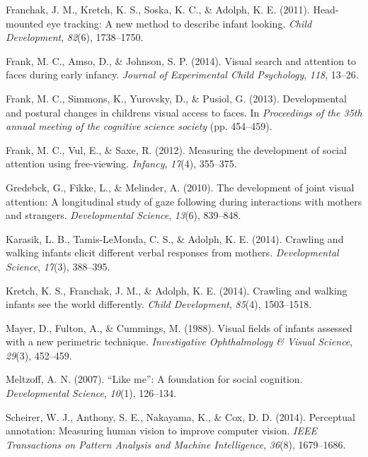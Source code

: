 \documentclass[10pt, letterpaper]{article}
\begin{document}
\hypertarget{ref-franchak2011}{}
Franchak, J. M., Kretch, K. S., Soska, K. C., \& Adolph, K. E. (2011).
Head-mounted eye tracking: A new method to describe infant looking.
\emph{Child Development}, \emph{82}(6), 1738--1750.

\hypertarget{ref-frank2014visual}{}
Frank, M. C., Amso, D., \& Johnson, S. P. (2014). Visual search and
attention to faces during early infancy. \emph{Journal of Experimental
Child Psychology}, \emph{118}, 13--26.

\hypertarget{ref-frank2013}{}
Frank, M. C., Simmons, K., Yurovsky, D., \& Pusiol, G. (2013).
Developmental and postural changes in childrens visual access to faces.
In \emph{Proceedings of the 35th annual meeting of the cognitive science
society} (pp. 454--459).

\hypertarget{ref-frank2012measuring}{}
Frank, M. C., Vul, E., \& Saxe, R. (2012). Measuring the development of
social attention using free-viewing. \emph{Infancy}, \emph{17}(4),
355--375.

\hypertarget{ref-gredeback2010development}{}
Gredebck, G., Fikke, L., \& Melinder, A. (2010). The
development of joint visual attention: A longitudinal study of gaze
following during interactions with mothers and strangers.
\emph{Developmental Science}, \emph{13}(6), 839--848.

\hypertarget{ref-karasik2014}{}
Karasik, L. B., Tamis-LeMonda, C. S., \& Adolph, K. E. (2014). Crawling
and walking infants elicit different verbal responses from mothers.
\emph{Developmental Science}, \emph{17}(3), 388--395.

\hypertarget{ref-kretch2014}{}
Kretch, K. S., Franchak, J. M., \& Adolph, K. E. (2014). Crawling and
walking infants see the world differently. \emph{Child Development},
\emph{85}(4), 1503--1518.

\hypertarget{ref-mayer1988}{}
Mayer, D., Fulton, A., \& Cummings, M. (1988). Visual fields of infants
assessed with a new perimetric technique. \emph{Investigative
Ophthalmology \& Visual Science}, \emph{29}(3), 452--459.

\hypertarget{ref-meltzoff2007like}{}
Meltzoff, A. N. (2007). ``Like me'': A foundation for social cognition.
\emph{Developmental Science}, \emph{10}(1), 126--134.

\hypertarget{ref-scheirer2014perceptual}{}
Scheirer, W. J., Anthony, S. E., Nakayama, K., \& Cox, D. D. (2014).
Perceptual annotation: Measuring human vision to improve computer
vision. \emph{IEEE Transactions on Pattern Analysis and Machine
Intelligence}, \emph{36}(8), 1679--1686.
\end{document}
